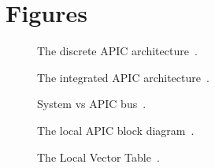 \chapter{Figures}
\label{ch:figures}

\clearpage

\begin{figure}[h]
  \centering
  \begin{subfigure}[b]{1.0\textwidth}
    
  \end{subfigure}
  \caption{The discrete APIC architecture~\cite[sec.~5.1]{mpspec}.}
  \label{fig:discreteapic}
\end{figure}

\begin{figure}[h]
  \centering
  \begin{subfigure}[b]{1.0\textwidth}
    
  \end{subfigure}
  \caption{The integrated APIC architecture~\cite[sec.~5.2]{mpspec}.}
  \label{fig:integratedapic}
\end{figure}

\begin{figure}[h]
  \centering
  \begin{subfigure}[b]{0.7\textwidth}
    
  \end{subfigure}
  \caption{System vs APIC bus~\cite[sec.~3.11.1]{ia32}.}
  \label{fig:systemvsapicbus}
\end{figure}

\begin{figure}[h]
  \centering
  \begin{subfigure}[b]{1.0\textwidth}
    
  \end{subfigure}
  \caption{The local APIC block diagram~\cite[sec.~3.11.4.1]{ia32}.}
  \label{fig:localapicblock}
\end{figure}

\begin{figure}[h]
  \centering
  \begin{subfigure}[b]{1.0\textwidth}
    
  \end{subfigure}
  \caption{The Local Vector Table~\cite[sec.~3.11.5.1]{ia32}.}
  \label{fig:localapiclvt}
\end{figure}
